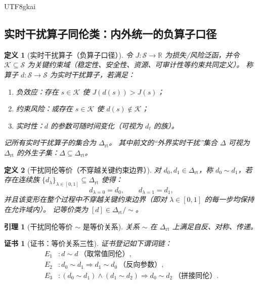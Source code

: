 \documentclass[12pt]{article}
\newtheorem{definition}{定义}[section]
\newtheorem{lemma}{引理}[section]
\newtheorem{Certificate}{证书}[section]
\newcommand{\RR}{\mathbb{R}}
\newcommand{\DeltaRT}{\ensuremath{\Delta_{\mathrm{rt}}}}
\begin{document}
\begin{CJK*}{UTF8}{gkai}
\subsection{实时干扰算子同伦类：内外统一的负算子口径}
\label{sec:disturbance-homotopy-class}

\begin{definition}[实时干扰算子（负算子口径）]
令 $J:\mathcal{S}\to\RR$ 为损失/风险泛函，并令 $\mathcal{K}\subseteq\mathcal{S}$ 为关键约束域（稳定性、安全性、资源、可审计性等约束共同定义）。
称算子 $d:\mathcal{S}\to\mathcal{S}$ 为实时干扰算子，若满足：
\begin{enumerate}
  \item 负效应：存在 $s\in\mathcal{K}$ 使 $J(d(s))>J(s)$；
  \item 约束风险：或存在 $s\in\mathcal{K}$ 使 $d(s)\notin\mathcal{K}$；
  \item 实时性：$d$ 的参数可随时间变化（可视为 $d_t$ 的族）。
\end{enumerate}
记所有实时干扰算子的集合为 $\DeltaRT$。
其中前文的“外界实时干扰”集合 $\Delta$ 可视为 $\DeltaRT$ 的外生子集：$\Delta\subseteq \DeltaRT$。
\end{definition}

\begin{definition}[干扰同伦等价（不穿越关键约束边界）]
对 $d_0,d_1\in\DeltaRT$，称 $d_0\sim d_1$，若存在连续族 $\{d_\lambda\}_{\lambda\in[0,1]}\subseteq\DeltaRT$ 使得：
\[
  d_{\lambda=0}=d_0,\qquad d_{\lambda=1}=d_1,
\]
并且该变形在整个过程中不穿越关键约束边界（即对 $\lambda\in[0,1]$ 的每一步均保持在允许域内）。
记等价类为 $[d]\in \DeltaRT/\!\sim$。
\end{definition}

\begin{lemma}[干扰同伦等价 $\sim$ 是等价关系]
\label{lem:disturbance-homotopy-is-equivalence}
关系 $\sim$ 在 $\DeltaRT$ 上满足自反、对称、传递。
\end{lemma}

\begin{Certificate}[证书：等价关系三性]
\label{cert:disturbance-homotopy-is-equivalence}
证书登记如下谓词链：
\[
\begin{aligned}
  E_1 &: d\sim d\ \text{（取常值同伦）},\\
  E_2 &: d_0\sim d_1\Rightarrow d_1\sim d_0\ \text{（反向参数）},\\
  E_3 &: (d_0\sim d_1)\wedge(d_1\sim d_2)\Rightarrow d_0\sim d_2\ \text{（拼接同伦）}.
\end{aligned}
\]
\end{Certificate}


\end{CJK*}
\end{document}
